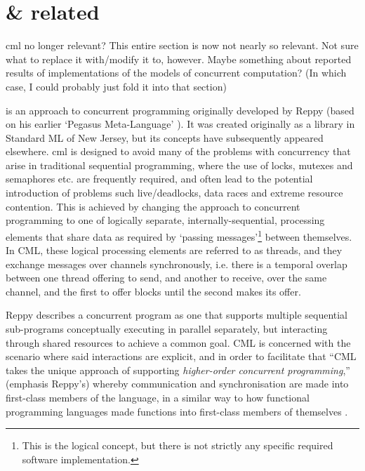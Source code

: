 \section{ \& related}

\begin{anfxerror}{\gls{cml} no longer relevant?}
    This entire section is now not nearly so relevant.  Not sure what to replace it with/modify it to, however.  Maybe something about reported results of implementations of the models of concurrent computation?  (In which case, I could probably just fold it into that section)
\end{anfxerror}

 \cite{Reppy1991,Panangaden1997} is an approach to concurrent programming originally developed by Reppy (based on his earlier `Pegasus Meta-Language' \cite{Reppy1988}).  It was created originally as a library in Standard ML of New Jersey, but its concepts have subsequently appeared elsewhere.   \Gls{cml} is designed to avoid many of the problems with concurrency that arise in traditional sequential programming, where the use of locks, mutexes and semaphores etc. are frequently required, and often lead to the potential introduction of problems such live/deadlocks, data races and extreme resource contention.  This is achieved by changing the approach to concurrent programming to one of logically separate, internally-sequential, processing elements that share data as required by `passing messages'\footnote{This is the logical concept, but there is not strictly any specific required software implementation.} between themselves.  In CML, these logical processing elements are referred to as threads, and they exchange messages over channels synchronously, i.e. there is a temporal overlap between one thread offering to send, and another to receive, over the same channel, and the first to offer blocks until the second makes its offer.%

Reppy describes a concurrent program as one that supports multiple sequential sub-programs conceptually executing in parallel separately, but interacting through shared resources to achieve a common goal.  CML is concerned with the scenario where said interactions are explicit, and in order to facilitate that ``CML takes the unique approach of supporting \emph{higher-order concurrent programming},'' (emphasis Reppy's) whereby communication and synchronisation are made into first-class members of the language, in a similar way to how functional programming languages made functions into first-class members of themselves \cite[Preface]{Reppy2007}.

